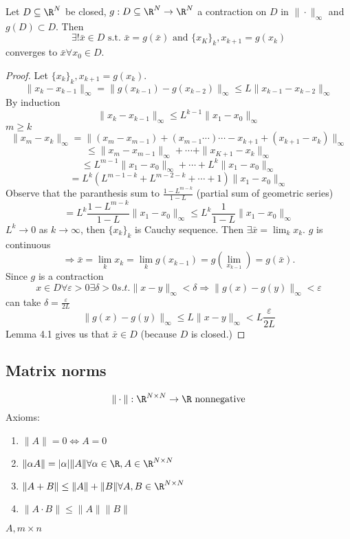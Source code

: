 \begin{theorem}%
  Let $D \subseteq \R^N $ be closed, $g: D \subseteq \R^N \to \R^N$ a contraction on $D$ in $\| \cdot  \|_{\infty } $ and $g(D)\subset D$. Then
    $$\exists ! \bar{x}\in D \text{ s.t. } \bar{x}=g(\bar{x}) \text{ and }\{x_K\}_k, x_{k+1}=g(x_k)$$
  converges to $\bar{x} \forall x_0 \in D$.
\end{theorem}
\begin{proof}
  Let $\{x_k\}_k, x_{k+1}=g(x_k)$.
      $$ \| x_k-x_{k-1} \|_{ \infty}= \| g(x_{k-1})-g(x_{k-2}) \|_{ \infty } \leq L \| x_{k-1}-x_{k-2} \|_{ \infty }$$
  By induction
    $$\| x_k-x_{k-1} \|_{ \infty } \leq L^{k-1}\| x_1-x_0 \|_{ \infty }$$
  $m\geq k$
    $$\| x_m-x_k \|_{  \infty}= \| (x_m-x_{m-1})+(x_{m-1}\cdots)\cdots -x_{k+1}+(x_{k+1}-x_k) \|_{ \infty }$$
    $$\leq \| x_m-x_{m-1} \|_{ \infty } + \cdots + \| x_{K+1}-x_k \|_{ \infty } $$
    $$\leq L^{m-1}\| x_1-x_0 \|_{ \infty } + \cdots +  L^k \| x_1-x_0 \|_{ \infty }$$
    $$=L^k \left(L^{m-1-k}+L^{m-2-k}+\cdots+1\right)\| x_1-x_0 \|_{ \infty } $$
    Observe that the paranthesis sum to $\frac{1-L^{m-k}}{1-L}$ (partial sum of geometric series)
    $$=L^k\frac{1-L^{m-k}}{1-L} \| x_1-x_0 \|_{ \infty } \leq L^k\frac{1}{1-L}\| x_1-x_0 \|_{\infty}$$
    $L^k \to 0$ as $k\to \infty$, then $\{x_k\}_k$ is Cauchy sequence. Then $\exists \bar{x}=\lim_k x_k$.
    \newline
    $g$ is continuous
      $$\Rightarrow \bar{x}=\lim_k x_k=\lim_k g(x_{k-1})=g(\lim_{x_{k-1}})=g(\bar{x}).$$
    Since $g$ is a contraction
        $$x\in D \forall \varepsilon >0 \exists \delta >0 s.t. \| x-y\|_{\infty}<\delta \Rightarrow \| g(x)-g(y) \|_{\infty}<\varepsilon$$
      can take $\delta = \frac{\varepsilon}{2L}$
          $$\| g(x)-g(y) \|_{\infty} \leq L \| x-y \|_{\infty} <L\frac{\varepsilon}{2L}$$
    Lemma 4.1 gives us that $\bar{x}\in D$ (because $D$ is closed.)
\end{proof}

\subsection*{Matrix norms}
$$\| \cdot \|: \R^{N\times N}\to \R \text{ nonnegative}$$
Axioms:
\begin{enumerate}[(1)]
  \item $\| A \|=0 \Leftrightarrow A=0 $
  \item $\| \alpha A \|=|\alpha|\| A \| \forall \alpha \in \R, A\in \R^{N\times N} $
  \item $\| A+B \|\leq \| A \|+\| B \| \forall A,B \in \R^{N\times N}$
  \item $\| A \cdot B \|\leq \| A \|\| B \|  $
\end{enumerate}
$A, m\times n$

